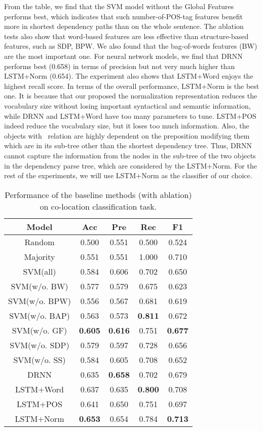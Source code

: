 From the table, we find that the SVM model without the Global Features performs best, which indicates that such number-of-POS-tag features benefit more in shortest dependency paths than on the whole sentence.
The ablation tests also show that word-based features are less effective
than structure-based features, such as SDP, BPW.
We also found that the bag-of-words features (BW) are the most important one.
For neural network models, we find that DRNN performs best (0.658) in terms of 
precision but not very much higher than LSTM+Norm (0.654). 
The experiment also shows that LSTM+Word enjoys the highest recall score.
In terms of the overall performance, LSTM+Norm is the best one. 
It is because that our proposed the normalization representation reduces the vocabulary size without losing important syntactical and semantic information, while DRNN and LSTM+Word have too many parameters to tune. LSTM+POS indeed reduce the vocabulary size, but it loses too much information. 
Also, the objects with \lnear\ relation are highly dependent on the preposition modifying them which are in its sub-tree other than the shortest dependency tree. 
Thus, DRNN cannot capture the information from the nodes in the sub-tree of the two objects in the dependency parse tree, which are considered by the LSTM+Norm. For the rest of the
experiments, we will use LSTM+Norm as the classifier of our choice.

\begin{table}[th]
	\centering
	\begin{tabular}{|c|c|c|c|c|}
	\hline
	\textbf{Model}	& \textbf{Acc} & \textbf{Pre} & \textbf{Rec} & \textbf{F1} \\		\hline \hline
	Random &	0.500 & 0.551 & 0.500 & 0.524  \\		\hline
	Majority &	0.551 & 0.551 & 1.000 & 0.710 \\		\hline
	 \hline
	SVM(all) &	0.584 & 0.606 & 0.702  & 0.650  \\		\hline
	SVM(w/o. BW) &0.577	&0.579	&0.675&	0.623	\\ \hline
	SVM(w/o. BPW) & 0.556 &	0.567&	0.681&	0.619	\\ \hline
	SVM(w/o. BAP)	& 0.563 &  0.573& \textbf{0.811}  & 0.672 \\		\hline
	SVM(w/o. GF)	&  \textbf{0.605} & \textbf{0.616} &0.751  & \textbf{0.677} \\		\hline
	SVM(w/o. SDP)	& 0.579 & 0.597 & 0.728  & 0.656\\		\hline
	SVM(w/o. SS)	&  0.584 &  0.605 &  0.708 & 	0.652	\\ \hline
	\hline
	DRNN	&  0.635 &  \textbf{0.658} &  0.702 & 	0.679	\\ \hline
	LSTM$+$Word 	&   0.637 & 0.635 & \textbf{0.800}   & 	 0.708	\\ \hline
	LSTM$+$POS	& 0.641 & 0.650  &  0.751 & 0.697	\\ \hline
	LSTM$+$Norm	&  \textbf{0.653 }&  0.654 & { 0.784} & 	\textbf{0.713}	\\ \hline
	\end{tabular}
	\caption{Performance of the baseline methods (with ablation) 
	on co-location classification task.}
	\label{tab:aprf}
\end{table}


